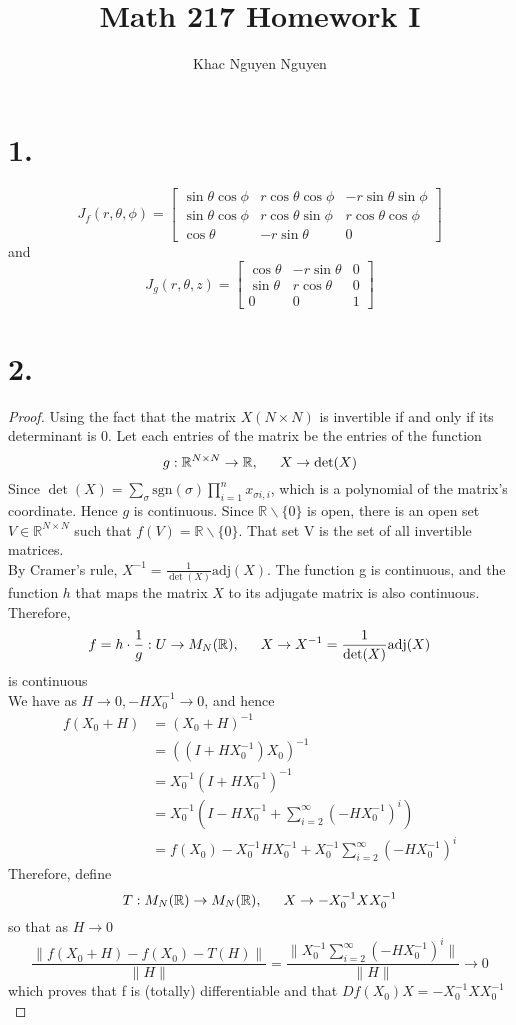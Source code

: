 \documentclass[11pt]{article}
\title{\textbf{Math 217 Homework I}}
\author{Khac Nguyen Nguyen}
\date{}
\begin{document}
\section*{1.}
\[
J_f(r,\theta,\phi) =
\begin{bmatrix}
\sin\theta\cos\phi &r\cos\theta\cos\phi &-r\sin\theta\sin\phi\\
\sin\theta\cos\phi &r\cos\theta\sin\phi & r\cos\theta\cos\phi\\
\cos\theta & -r\sin\theta & 0 
\end{bmatrix}
\]
and\\
\[
J_g(r,\theta,z) =
\begin{bmatrix}
\cos\theta & -r\sin\theta & 0\\
\sin\theta & r\cos\theta & 0\\
0 & 0 & 1
\end{bmatrix}
\]
\pagebreak
\section*{2.} 
\begin{proof}
Using the fact that the matrix $X(N \times N)$ is invertible if and only if its determinant is 0. Let each entries of the matrix be the entries of the function 
\[
g: \mathbb{R}^{N \times N} \to \mathbb{R}, \indent X\to \det(X) 
\]
Since $\det(X) = \sum_\sigma \text{sgn}(\sigma) \prod_{i=1}^n x_{\sigma{i}, i}$, which is a polynomial of the matrix's coordinate. Hence $g$ is continuous.
Since $\mathbb{R}\backslash \{0\}$ is open, there is an open set $V \in \mathbb{R}^{N \times N}$ such that $f(V) = \mathbb{R} \backslash \{0\}$. That set V is the set of all invertible matrices. \\
By Cramer's rule, $X^{-1} = \frac{1}{\det(X)}\text{adj}(X)$. The function g is continuous, and the function $h$ that maps the matrix $X$ to its adjugate matrix is also continuous. Therefore,
\[f=h \cdot \frac{1}{g}:U \to M_N(\mathbb{R}), \indent X \to X^{-1}= \frac{1}{\det(X)}\text{adj}(X)\]
is continuous\\
We have as $H \to 0, -HX_0^{-1} \to 0$, and hence
\begin{equation*}
\begin{aligned}
f(X_0+H) &= (X_0+H)^{-1} \\
&=((I+HX_0^{-1})X_0)^{-1} \\
&=X_0^{-1}(I+HX_0^{-1})^{-1} \\
&=X_0^{-1}\left(I-HX_0^{-1}+ \sum_{i=2}^\infty(-HX_0^{-1})^i \right)\\
&=f(X_0)-X_0^{-1}HX_0^{-1}+ X_0^{-1}\sum_{i=2}^\infty(-HX_0^{-1})^i
\end{aligned}
\end{equation*}
Therefore, define
\[
T: M_N(\mathbb{R}) \to M_N(\mathbb{R}), \indent X \to -X_0^{-1}XX_0^{-1}
\]
so that as $H \to 0$
\[
\frac{\|f(X_0+H)-f(X_0)-T(H)\|}{\|H\|} 
=\frac{\|X_0^{-1} \sum_{i=2}^\infty(-HX_0^{-1})^i\|}{\|H\|}
\to 0
\]
which proves that f is (totally) differentiable and that $Df(X_0)X= -X_0^{-1}XX_0^{-1}$\\
\end{proof}
\pagebreak
\end{document}
